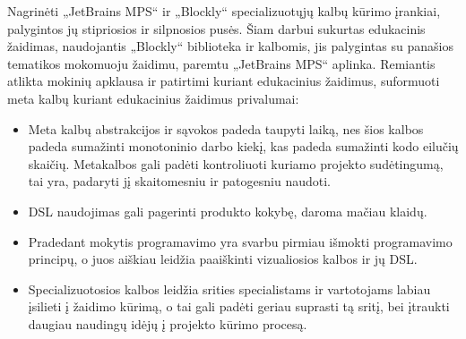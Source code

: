 \documentclass{VUMIFPSkursinis}
\begin{document}
Nagrinėti „JetBrains MPS“ ir „Blockly“ specializuotųjų kalbų kūrimo įrankiai, palygintos jų stipriosios ir silpnosios pusės. Šiam darbui sukurtas edukacinis žaidimas, naudojantis „Blockly“ biblioteka ir kalbomis, jis palygintas su panašios tematikos mokomuoju žaidimu, paremtu „JetBrains MPS“ aplinka. Remiantis atlikta mokinių apklausa ir patirtimi kuriant edukacinius žaidimus, suformuoti meta kalbų kuriant edukacinius žaidimus privalumai:
\begin{itemize}
    \item Meta kalbų abstrakcijos ir sąvokos padeda taupyti laiką, nes šios kalbos padeda sumažinti monotoninio darbo kiekį, kas padeda sumažinti kodo eilučių skaičių. Metakalbos gali padėti kontroliuoti kuriamo projekto sudėtingumą, tai yra, padaryti jį skaitomesniu ir patogesniu naudoti. 
    \item DSL naudojimas gali pagerinti produkto kokybę, daroma mačiau klaidų.
    \item Pradedant mokytis programavimo yra svarbu pirmiau išmokti programavimo principų, o juos aiškiau leidžia paaiškinti vizualiosios kalbos ir jų DSL.
    \item Specializuotosios kalbos leidžia srities specialistams ir vartotojams labiau įsilieti į žaidimo kūrimą, o tai gali padėti geriau suprasti tą sritį, bei įtraukti daugiau naudingų idėjų į projekto kūrimo procesą.
\end{itemize}
\end{document}
